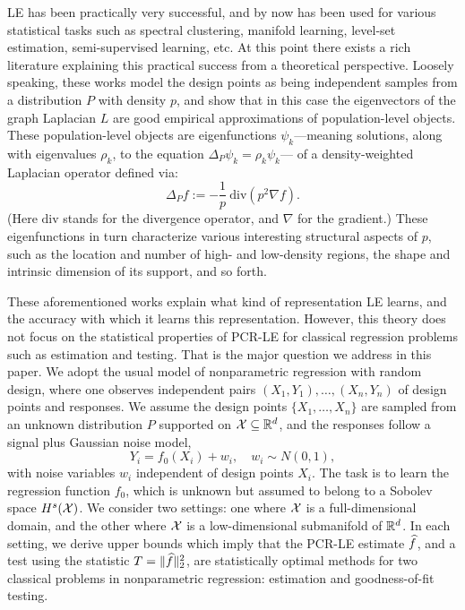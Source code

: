 LE has been practically very successful, and by now has been used for various statistical tasks such as spectral clustering, manifold learning, level-set estimation, semi-supervised learning, etc. At this point there exists a rich literature \citep{koltchinskii2000,belkin07,vonluxburg2008,burago2014,shi2015,singer2017,garciatrillos18,trillos2019, calder2019, cheng2021,dunson2021} explaining this practical success from a theoretical perspective. Loosely speaking, these works model the design points as being independent samples from a distribution $P$ with density $p$, and show that in this case the eigenvectors of the graph Laplacian $L$ are good empirical approximations of population-level objects. These population-level objects are eigenfunctions $\psi_k$---meaning solutions, along with eigenvalues $\rho_k$, to the equation $\Delta_P \psi_k = \rho_k \psi_k$--- of a density-weighted Laplacian operator defined via:
\begin{equation}
\label{eqn:density-weighted-laplace}
\Delta_Pf := -\frac{1}{p}~ \mathrm{div}(p^2 \nabla f).
\end{equation}  
(Here $\mathrm{div}$ stands for the divergence operator, and $\nabla$ for the gradient.) These eigenfunctions in turn characterize various interesting structural aspects of $p$, such as the location and number of high- and low-density regions, the shape and intrinsic dimension of its support, and so forth.

These aforementioned works explain what kind of representation LE learns, and the accuracy with which it learns this representation. However, this theory does not focus on the statistical properties of PCR-LE for classical regression problems such as estimation and testing. That is the major question we address in this paper. We adopt the usual model of nonparametric regression with random design, where one observes independent pairs $(X_1,Y_1),\ldots,(X_n,Y_n)$ of design points and responses. We assume the design points $\{X_1,\ldots,X_n\}$ are sampled from an unknown distribution $P$ supported on $\mathcal{X} \subseteq \mathbb{R}^d$, and the responses follow a signal plus Gaussian noise model,
\begin{equation}
\label{eqn:model}
Y_i = f_0(X_i) + w_i, \quad w_i \sim N(0,1),
\end{equation}
with noise variables $w_i$  independent of design points $X_i$. The task is to learn the regression function $f_0$, which is unknown but assumed to belong to a Sobolev space $H^s(\mathcal{X})$. We consider two settings: one where $\mathcal{X}$ is a full-dimensional domain, and the other where $\mathcal{X}$ is a low-dimensional submanifold of $\mathbb{R}^d$. In each setting, we derive upper bounds which imply that the PCR-LE estimate $\widehat{f}$, and a test using the statistic $T = \|\widehat{f}\|_2^2$, are statistically optimal methods for two classical problems in nonparametric regression: estimation and goodness-of-fit testing. 

